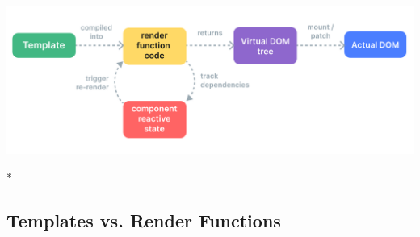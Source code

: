 \begin{center} 
\includegraphics{./img/render-pipeline.03805016.png} 
\end{center}
    

\begin{paracol}{2} 
 
\switchcolumn[0]*%
\subsection{Templates vs. Render Functions}
\switchcolumn

\end{paracol}

